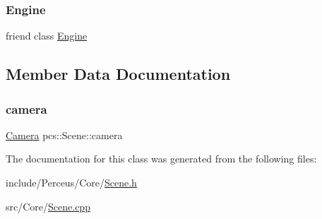 \subsubsection{\texorpdfstring{Engine}{Engine}}
{\footnotesize\ttfamily friend class \hyperlink{classpcs_1_1Engine}{Engine}\hspace{0.3cm}{\ttfamily [friend]}}



\subsection{Member Data Documentation}
\mbox{\label{classpcs_1_1Scene_ad71d97a418c46759bda1c84742ab9fd3}} 
\subsubsection{\texorpdfstring{camera}{camera}}
{\footnotesize\ttfamily \hyperlink{classpcs_1_1Camera}{Camera} pcs\+::\+Scene\+::camera\hspace{0.3cm}{\ttfamily [private]}}



The documentation for this class was generated from the following files\+:\begin{DoxyCompactItemize}
\item 
include/\+Perceus/\+Core/\hyperlink{Scene_8h}{Scene.\+h}\item 
src/\+Core/\hyperlink{Scene_8cpp}{Scene.\+cpp}\end{DoxyCompactItemize}
